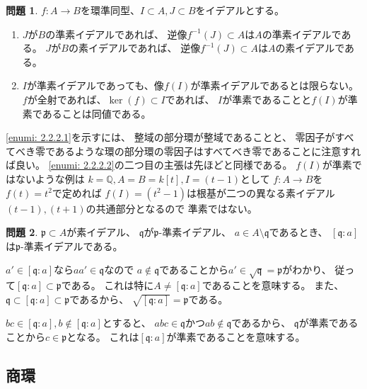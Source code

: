 \documentclass[uplatex]{jsarticle}
\makeatletter
\theoremstyle{definition}
\newtheorem{prob}[prob]{問題}
\renewenvironment{proof}[1][\proofname]{
  \pushQED{\qed}%
  \normalfont \topsep6\p@\@plus6\p@\relax
  \trivlist
  \item[\hskip\labelsep
    #1\@addpunct{\textbf{.}}]\ignorespaces
}{%
  \popQED\endtrivlist\@endpefalse
}
\providecommand{\proofname}{証明}
\newcommand\Q{\mathbb{Q}}
\newcommand\mfp{\mathfrak{p}}
\newcommand\mfq{\mathfrak{q}}
\makeatother
\begin{document}
\begin{prob}\label{prob: 2.2.2}
  \(f:A\to B\)を環準同型、\(I\subset A, J\subset B\)をイデアルとする。
  \begin{enumerate}
    \item \label{enumi: 2.2.2.1}
    \(J\)が\(B\)の準素イデアルであれば、
    逆像\(f^{-1}(J)\subset A\)は\(A\)の準素イデアルである。
    \(J\)が\(B\)の素イデアルであれば、
    逆像\(f^{-1}(J)\subset A\)は\(A\)の素イデアルである。
    \item \label{enumi: 2.2.2.2}
    \(I\)が準素イデアルであっても、像\(f(I)\)が準素イデアルであるとは限らない。
    \(f\)が全射であれば、\(\ker(f)\subset I\)であれば、
    \(I\)が準素であることと\(f(I)\)が準素であることは同値である。
  \end{enumerate}
\end{prob}

\begin{proof}
  \ref{enumi: 2.2.2.1}を示すには、
  整域の部分環が整域であることと、
  零因子がすべてべき零であるような環の部分環の零因子はすべてべき零であることに注意すれば良い。
  \ref{enumi: 2.2.2.2}の二つ目の主張は先ほどと同様である。
  \(f(I)\)が準素ではないような例は
  \(k = \Q, A=B=k[t], I=(t-1)\)として
  \(f:A\to B\)を\(f(t)=t^2\)で定めれば
  \(f(I) = (t^2-1)\)は根基が二つの異なる素イデアル\((t-1),(t+1)\)の共通部分となるので
  準素ではない。
\end{proof}




\begin{prob}\label{prob: 2.2.3}
  \(\mfp\subset A\)が素イデアル、
  \(\mfq\)が\(\mfp\)-準素イデアル、
  \(a\in A\setminus \mfq\)であるとき、
  \([\mfq:a]\)は\(\mfp\)-準素イデアルである。
\end{prob}

\begin{proof}
  \(a'\in [\mfq:a]\)なら\(aa'\in \mfq\)なので
  \(a\not\in \mfq\)であることから\(a'\in\sqrt{\mfq} = \mfp\)がわかり、
  従って\([\mfq:a]\subset \mfp\)である。
  これは特に\(A\neq [\mfq:a]\)であることを意味する。
  また、\(\mfq\subset [\mfq:a]\subset\mfp\)であるから、
  \(\sqrt{[\mfq:a]} = \mfp\)である。

  \(bc\in [\mfq:a], b\not\in [\mfq:a]\)とすると、
  \(abc\in \mfq\)かつ\(ab\not\in \mfq\)であるから、
  \(\mfq\)が準素であることから\(c\in \mfp\)となる。
  これは\([\mfq:a]\)が準素であることを意味する。
\end{proof}



\subsection{商環}
\end{document}
